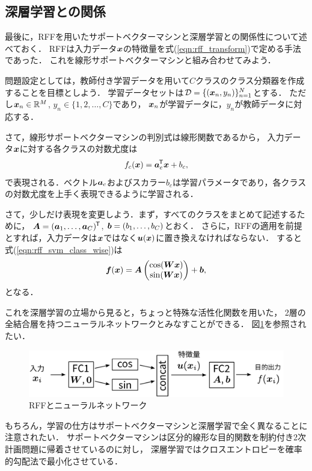 \subsection{深層学習との関係}

最後に，RFFを用いたサポートベクターマシンと深層学習との関係性について述べておく．
RFFは入力データ$\boldsymbol{x}$の特徴量を式(\ref{eqn:rff_transform})で定める手法であった．
これを線形サポートベクターマシンと組み合わせてみよう．

問題設定としては，教師付き学習データを用いて$C$クラスのクラス分類器を作成することを目標としよう．
学習データセットは$\mathcal{D} = \{ (\boldsymbol{x}_n, y_n) \}_{n=1}^{N}$とする．
ただし$\boldsymbol{x}_n \in \mathbb{R}^M$, $y_n \in \{1, 2, \ldots, C\}$であり，
$\boldsymbol{x}_n$が学習データに，$y_n$が教師データに対応する．

さて，線形サポートベクターマシンの判別式は線形関数であるから，
入力データ$\boldsymbol{x}$に対する各クラスの対数尤度は
\begin{equation}
    f_c(\boldsymbol{x}) = \boldsymbol{a}_c^{\mkern-1.5mu\mathsf{T}} \boldsymbol{x} + b_c,
    \label{eqn:rff_svm_class_wise}
\end{equation}
で表現される．ベクトル$\boldsymbol{a}_c$およびスカラー$b_c$は学習パラメータであり，各クラスの対数尤度を上手く表現できるように学習される．

さて，少しだけ表現を変更しよう．まず，すべてのクラスをまとめて記述するために，
$\boldsymbol{A} = (\boldsymbol{a}_1, \ldots, \boldsymbol{a}_C)^{\mkern-1.5mu\mathsf{T}}$, $\boldsymbol{b} = (b_1, \ldots, b_C)$とおく．
さらに，RFFの適用を前提とすれば，入力データは$\boldsymbol{x}$ではなく$\boldsymbol{u}(\boldsymbol{x})$に置き換えなければならない．
すると式(\ref{eqn:rff_svm_class_wise})は
\begin{equation}
    \boldsymbol{f}(\boldsymbol{x}) = \boldsymbol{A}
    \begin{pmatrix}
        \cos(\boldsymbol{Wx}) \\ \sin(\boldsymbol{Wx})
    \end{pmatrix}
    + \boldsymbol{b},
\end{equation}
となる．

これを深層学習の立場から見ると，ちょっと特殊な活性化関数を用いた，
2層の全結合層を持つニューラルネットワークとみなすことができる．
図\ref{fig:rff_svc_as_dnn}を参照されたい．

\begin{figure}[t]
    \centerline{\includegraphics[width=350pt]{figures/rff_svc_as_dnn.pdf}}
    \caption{RFFとニューラルネットワーク}
    \label{fig:rff_svc_as_dnn}
\end{figure}

もちろん，学習の仕方はサポートベクターマシンと深層学習で全く異なることに注意されたい．
サポートベクターマシンは区分的線形な目的関数を制約付き2次計画問題に帰着させているのに対し，
深層学習ではクロスエントロピーを確率的勾配法で最小化させている．

